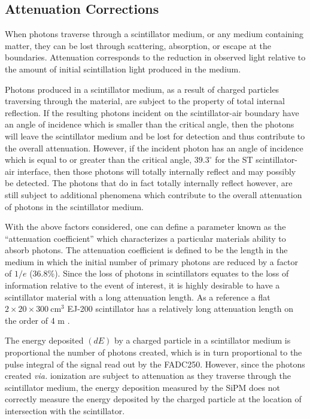 \subsection{Attenuation Corrections} \label{sec:calib_ac}

When photons traverse through a scintillator medium, or any medium containing matter, they can be lost through scattering, absorption, or escape at the boundaries.  Attenuation corresponds to the reduction in observed light relative to the amount of initial scintillation light produced in the medium.

Photons produced in a scintillator medium, as a result of charged particles traversing through the material,  are subject to the property of total internal reflection.  If the resulting photons incident on the scintillator-air boundary have an angle of incidence which is smaller than the critical angle, then the photons will leave the scintillator medium and be lost for detection and thus contribute to the overall attenuation.  However, if the incident  photon has an angle of incidence which is equal to or greater than the critical angle, $39.3^{\circ}$ for the ST scintillator-air interface, then those photons will totally internally reflect and may possibly be detected.  The photons that do in fact totally internally reflect however, are still subject to additional phenomena which contribute to the overall attenuation of photons in the scintillator medium.  

With the above factors considered, one can define a parameter known as the ``attenuation coefficient'' which characterizes a particular materials ability to absorb photons. The attenuation coefficient is defined to be the length in the medium in which the initial number of primary  photons are reduced by a factor of $1/e$ (36.8\%).  Since the loss of photons in scintillators equates to the loss of information relative to the event of interest, it is highly desirable to have a scintillator material with a long attenuation length.  As a reference a flat $2 \times 20 \times 300\ \mathrm{cm^{3}}$ EJ-200 scintillator has a relatively long attenuation length on the order of 4 m \cite{ej200_specs}.

The energy deposited $(dE)$ by a charged particle in a scintillator medium is proportional the number of photons created, which is in turn proportional to the pulse integral of the signal read out by the FADC250.  However, since the photons created \textit{via.} ionization are subject to attenuation as they traverse through the scintillator medium, the energy deposition measured by the SiPM does not correctly measure the energy deposited by the charged particle at the location of intersection with the scintillator.  

